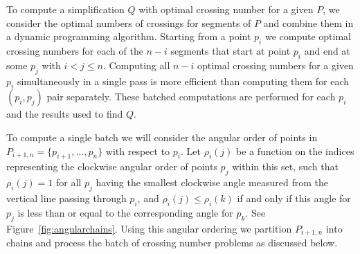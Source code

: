 \documentclass{article}
\begin{document}
To compute a simplification $Q$ with optimal crossing number for a given $P$,
we consider the optimal numbers of crossings for segments of $P$ and combine
them in a dynamic programming algorithm.  Starting from a point $p_i$ we
compute optimal crossing numbers for each of the $n-i$ segments that start
at point $p_i$ and end at some $p_j$ with $i<j\le n$.  Computing all $n-i$
optimal crossing numbers for a given $p_i$ simultaneously in a single pass
is more efficient than computing them for each $(p_i,p_j)$ pair separately. 
These batched computations are performed for each $p_i$ and the results used
to find $Q$.

To compute a single batch we will consider the angular order of points in
$P_{i+1,n}=\{p_{i+1},\ldots,p_n\}$ with respect to $p_i$.  Let
$\rho_i(j)$ be a function on the indices representing the clockwise angular
order of points $p_j$ within this set, such that $\rho_i(j)=1$ for 
all $p_j$ having the smallest clockwise angle measured from the vertical
line passing through $p_i$, and $\rho_i(j)\le\rho_i(k)$ if and only if this
angle for $p_j$ is less than or equal to the corresponding angle for $p_k$.
See Figure~\ref{fig:angularchains}.  Using this
angular ordering we partition $P_{i+1,n}$ into chains and process the
batch of crossing number problems as discussed below.
\end{document}
